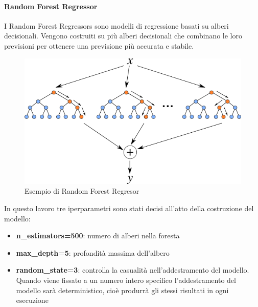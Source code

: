 \paragraph{Random Forest Regressor}
I Random Forest Regressors sono modelli di regressione basati su alberi decisionali. Vengono costruiti su più alberi decisionali che combinano le loro previsioni per ottenere una previsione più accurata e stabile.
\begin{figure}[H]
    \centering
    \includegraphics[scale=0.5]{images/RandomForestRegressor.png}
    \caption{Esempio di Random Forest Regresor}
\end{figure}

\noindent In questo lavoro tre iperparametri sono stati decisi all'atto della costruzione del modello:
\begin{itemize}
    \item \textbf{n\_estimators=500}: numero di alberi nella foresta
    \item \textbf{max\_depth=5}: profondità massima dell'albero
    \item \textbf{random\_state=3}:  controlla la casualità nell'addestramento del modello. Quando viene fissato a un numero intero specifico l'addestramento del modello sarà deterministico, cioè produrrà gli stessi risultati in ogni esecuzione
\end{itemize}

